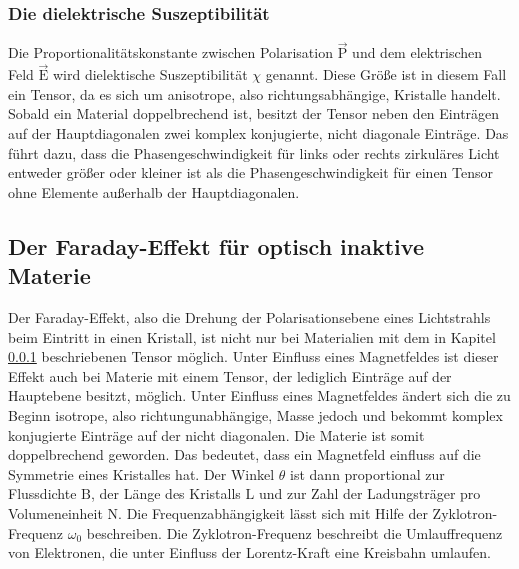 \subsubsection{Die dielektrische Suszeptibilität}
\label{sssec:sus}
Die Proportionalitätskonstante zwischen Polarisation $\vec{\text{P}}$ und dem
elektrischen Feld $\vec{\text{E}}$ wird dielektische Suszeptibilität $\chi$
genannt. Diese Größe ist in diesem Fall ein Tensor, da es sich um anisotrope,
also richtungsabhängige, Kristalle handelt. Sobald ein Material doppelbrechend
ist, besitzt der Tensor neben den Einträgen auf der Hauptdiagonalen zwei
komplex konjugierte, nicht diagonale Einträge. Das führt dazu, dass die
Phasengeschwindigkeit für links oder rechts zirkuläres Licht entweder größer
oder kleiner ist als die Phasengeschwindigkeit für einen Tensor ohne Elemente
außerhalb der Hauptdiagonalen.

\subsection{Der Faraday-Effekt für optisch inaktive Materie}
Der Faraday-Effekt, also die Drehung der Polarisationsebene eines Lichtstrahls
beim Eintritt in einen Kristall, ist nicht nur bei Materialien mit dem in
Kapitel \ref{sssec:sus} beschriebenen Tensor möglich. Unter Einfluss eines
Magnetfeldes ist dieser Effekt auch bei Materie mit einem Tensor, der
lediglich Einträge auf der Hauptebene besitzt, möglich. Unter Einfluss eines
Magnetfeldes ändert sich die zu Beginn isotrope, also richtungunabhängige, Masse
jedoch und bekommt komplex konjugierte Einträge auf der nicht diagonalen. Die
Materie ist somit doppelbrechend geworden. Das bedeutet, dass ein Magnetfeld
einfluss auf die Symmetrie eines Kristalles hat. Der Winkel $\theta$ ist dann
proportional zur Flussdichte $\text{B}$, der Länge des Kristalls $\text{L}$ und
zur Zahl der Ladungsträger pro Volumeneinheit $\text{N}$. Die
Frequenzabhängigkeit lässt sich mit Hilfe der Zyklotron-Frequenz $\omega_0$
beschreiben. Die Zyklotron-Frequenz beschreibt die Umlauffrequenz von Elektronen,
die unter Einfluss der Lorentz-Kraft eine Kreisbahn umlaufen. 
